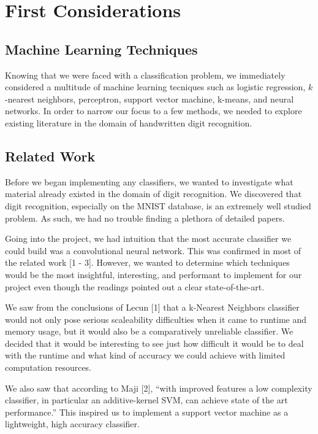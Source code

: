 \documentclass{article} %
\begin{document}
\section{First Considerations}
\subsection{Machine Learning Techniques}
Knowing that we were faced with a classification problem, we immediately
considered a multitude of machine learning tecniques such as logistic
regression, $k$-nearest neighbors, perceptron, support vector machine, k-means,
and neural networks. In order to narrow our focus to a few methods, we needed to
explore existing literature in the domain of handwritten digit recognition.

\subsection{Related Work}
Before we began implementing any classifiers, we wanted to investigate what
material already existed in the domain of digit recognition. We discovered
that digit recognition, especially on the MNIST database, is an extremely well
studied problem. As such, we had no trouble finding a plethora of detailed
papers.

Going into the project, we had intuition that the most accurate classifier we
could build was a convolutional neural network. This was confirmed in most of
the related work [1 - 3].
However, we wanted to determine which techniques would be the most insightful,
interesting, and performant to implement for our project even though the
readings pointed out a clear state-of-the-art.

We saw from the
conclusions of Lecun [1] that a k-Nearest Neighbors classifier would not
only pose serious scaleability difficulties when it came to runtime and memory
usage, but it would also be a comparatively unreliable classifier. We decided
that it would be interesting to see just how difficult it would be to deal with
the runtime and what kind of accuracy we could achieve with limited
computation resources.

We also saw that according to Maji [2], ``with improved features a low
complexity classifier, in particular
an additive-kernel SVM, can achieve state of the art performance.'' This
inspired us to implement a support vector machine as a lightweight, high
accuracy classifier.

\end{document}
